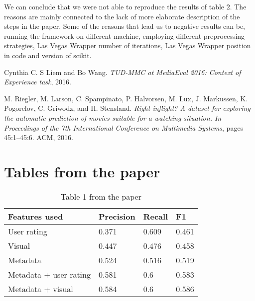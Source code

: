 \documentclass[sigconf]{acmart}
\begin{document}
We can conclude that we were not able to reproduce the results of table 2. The reasons are mainly connected to the lack of more elaborate description of the steps in the paper. Some of the reasons that lead us to negative results can be, running the framework on different machine, employing different preprocessing strategies, Las Vegas Wrapper number of iterations, Las Vegas Wrapper position in code and version of scikit.



\begin{thebibliography}{2}

 Cynthia C. S Liem and Bo Wang. \textit{TUD-MMC at MediaEval 2016: Context of Experience task}, 2016.

 M. Riegler, M. Larson, C. Spampinato, P. Halvorsen, M. Lux, J. Markussen, K. Pogorelov, C. Griwodz, and H. Stensland. \textit{Right inﬂight? A dataset for exploring the automatic prediction of movies suitable for a watching situation. In Proceedings of the 7th International Conference on Multimedia Systems}, pages 45:1–45:6. ACM, 2016.

\end{thebibliography}

\newpage
\clearpage
\newpage
\appendix

\section{Tables from the paper}

\begin{table}[hbt!]
  \caption*{Table 1 from the paper}
\begin{tabular}{llll}
\hline
Features used          & Precision & Recall & F1    \\ \hline
User rating            & 0.371     & 0.609  & 0.461 \\
Visual                 & 0.447     & 0.476  & 0.458 \\
Metadata               & 0.524     & 0.516  & 0.519 \\
Metadata + user rating & 0.581     & 0.6    & 0.583 \\
Metadata + visual      & 0.584     & 0.6    & 0.586 \\ \hline
\end{tabular}
\end{table}
\end{document}
